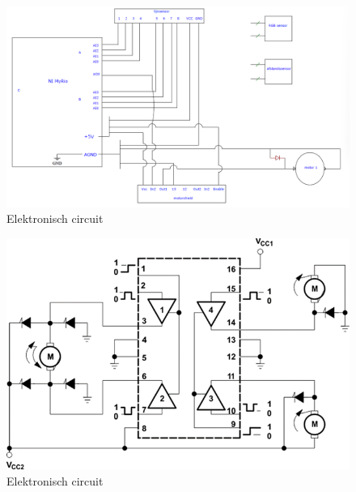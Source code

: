 \documentclass[kulak]{kulakarticle} %
\begin{document}
\begin{figure}[h]
	\centering
	\includegraphics[width=.6\textwidth]{elektrischCircuit1}
	\caption{Elektronisch circuit}
	\label{fig:elektrischCircuit}
\end{figure}
\begin{figure}[h]
	\centering
	\includegraphics[width=.6\textwidth]{elektrischCircuit2}
	\caption{Elektronisch circuit}
	\label{fig:elektrischCircuit}
\end{figure}


%
%
\end{document}
